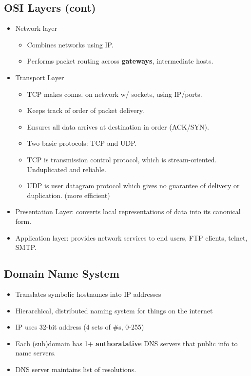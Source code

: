 \documentclass[fontsize=4.5pt]{scrartcl}
\begin{document}
\begin{multicols}{3}
     \subsection{OSI Layers (cont)}
       \begin{itemize}
         \item Network layer
         \begin{itemize}
           \item Combines networks using IP. 
           \item Performs packet routing across \textbf{gateways}, intermediate hosts.
         \end{itemize}
         \item Transport Layer
         \begin{itemize}
           \item TCP makes conns. on network w/ sockets, using IP/ports.
           \item Keeps track of order of packet delivery.
           \item Ensures all data arrives at destination in order (ACK/SYN).
           \item Two basic protocols: TCP and UDP.
           \item TCP is transmission control protocol, which is stream-oriented. Unduplicated and reliable.
           \item UDP is user datagram protocol which gives no guarantee of delivery or duplication. (more efficient)
         \end{itemize}
          \item Presentation Layer: converts local representations of data into its canonical form.
          \item Application layer: provides network services to end users, FTP clients, telnet, SMTP.
        \end{itemize}
     \subsection{Domain Name System}
       \begin{itemize}
         \item Translates symbolic hostnames into IP addresses
         \item Hierarchical, distributed naming system for things on the internet
         \item IP uses 32-bit address (4 sets of \#s, 0-255)
         \item Each (sub)domain has 1+ \textbf{authoratative} DNS servers that public info to name servers.
         \item DNS server maintains list of resolutions.
       \end{itemize}
      

\end{multicols}
\end{document}
